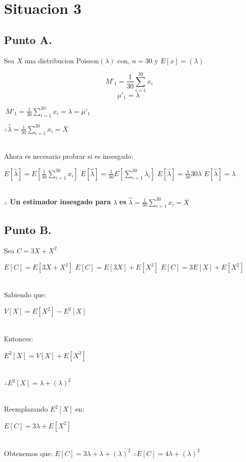 \documentclass[letterpaper,12pt,onecolumn,titlepage]{article}
\begin{document}
\section{Situacion 3}
\subsection{Punto A.}

Sea $X$ una distribucion Poisson$(\lambda)$ con, $n=30$ y $E[x]=(\lambda)$

$$\ M'_1 = \frac{1}{30} \sum_{i=1}^{30}x_{i}$$
$$\mu'_1 = \lambda$$

$\ M'_1 = \frac{1}{30} \sum_{i=1}^{30}x_{i} = \lambda = \mu'_1$

$\therefore \hat{\lambda}= \frac{1}{30} \sum_{i=1}^{30}x_{i} = \overline{X}$
 
~\\Ahora es necesario probrar si es insesgado: 

$E[\hat{\lambda}]=E[\frac{1}{30} \sum_{i=1}^{30}x_{i}]$
$E[\hat{\lambda}]=\frac{1}{30} E[\sum_{i=1}^{30}{\lambda}_{i}]$
$E[\hat{\lambda}]=\frac{1}{30}30\lambda$
$E[\hat{\lambda}]=\lambda$

~\\$\therefore$ \textbf{Un estimador insesgado para} $\lambda$ \textbf{es} $\hat{\lambda}= \frac{1}{30} \sum_{i=1}^{30}x_{i} = \overline{X}$

\subsection{Punto B.}

Sea $C=3X+X^2$

$E[C]=E[3X+X^2]$
$E[C]=E[3X] + E[X^2]$
$E[C]=3E[X] + E[X^2]$

~\\ Sabiendo que:
 
$V[X]=E[X^2] - E^2[X]$


~\\ Entonces: 

$E^2[X] = V[X] + E[X^2]$

~\\$\therefore E^2[X] = \lambda + (\lambda)^2$

~\\ Reemplazando $E^2[X]$ en:\ 

$E[C]=3\lambda + E[X^2]$

~\\Obtenemos que: 
$E[C]=3\lambda + \lambda + (\lambda)^2$
$\therefore E[C] = 4\lambda + (\lambda)^2$



\end{document}
